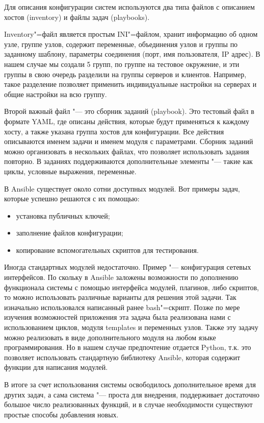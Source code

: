 \documentclass[10pt, a5paper]{article}
\begin{document}
Для описания конфигурации систем используются два типа файлов с описанием хостов (inventory) и файлы задач (playbooks).

Inventory"=файл является простым INI"=файлом, хранит информацию об одном узле, группе узлов, содержит переменные, объединения узлов и группы по заданному шаблону, параметры соединения (порт, имя пользователя, IP адрес). В нашем случае мы создали 5 групп, по группе на тестовое окружение, и эти группы в свою очередь  разделили на группы серверов и клиентов. Например, такое разделение позволяет применить индивидуальные настройки на серверах и общие настройки на всю группу.

Второй важный файл "--- это сборник заданий (playbook). Это тестовый файл в формате YAML, где описаны действия, которые будут применяться к каждому хосту, а также указана группа хостов для конфигурации. Все действия описываются именем задачи и именем модуля с параметрами. Сборник заданий можно организовать в нескольких файлах, что позволяет использовать задания повторно. В заданиях поддерживаются дополнительные элементы "--- такие как циклы, условные выражения, переменные.

В Ansible существует около сотни доступных модулей. Вот примеры задач, которые успешно решаются с их помощью:

\begin{itemize}
  \item установка публичных ключей;
  \item заполнение файлов конфигурации;
  \item копирование вспомогательных скриптов для тестирования.
\end{itemize}

Иногда стандартных модулей недостаточно. Пример "--- конфигурация сетевых интерфейсов. По скольку в Ansible заложены возможности по дополнению функционала  системы с помощью интерфейса модулей, плагинов, либо скриптов, то можно использовать различные варианты для решения этой задачи. Так изначально использовался написанный ранее bash"=скрипт. Позже по мере изучения возможностей приложения эта задача была реализована нами с использованием циклов, модуля templates и переменных узлов. Также эту задачу можно реализовать в виде дополнительного модуля на любом языке программирования. Но в нашем случае предпочтение отдается Python, т.к. это позволяет  использовать стандартную библиотеку Ansible, которая содержит функции для написания модулей.

В итоге за счет использования системы освободилось дополнительное время для других задач, а сама система "--- проста для внедрения, поддерживает достаточно большое число реализованных функций, и в случае необходимости существуют простые способы добавления новых.
\end{document}
